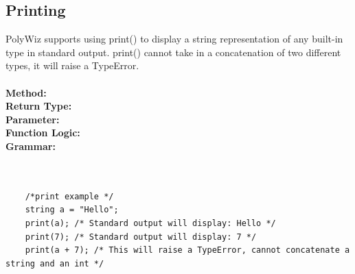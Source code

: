 \documentclass{article}
\begin{document}
\subsection{Printing}
PolyWiz supports using print() to display a string representation of any built-in type in standard output. print() cannot take in a concatenation of two different types, it will raise a TypeError. \\ \\
\textbf{Method:} \\
\textbf{Return Type:}\\
\textbf{Parameter:}\\
\textbf{Function Logic:}\\
\textbf{Grammar:}\\
    \\
    \\
\begin{lstlisting}
    /*print example */
    string a = "Hello";
    print(a); /* Standard output will display: Hello */
    print(7); /* Standard output will display: 7 */
    print(a + 7); /* This will raise a TypeError, cannot concatenate a string and an int */
\end{lstlisting}
\end{document}
